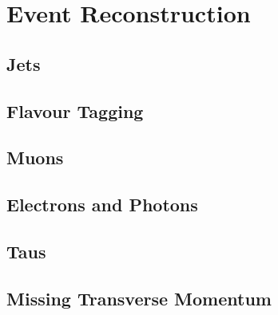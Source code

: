 \chapter{Event Reconstruction}\label{chapter:event_reconstruction}

\section{Jets}

\section{Flavour Tagging}

\section{Muons}

\section{Electrons and Photons}

\section{Taus}

\section{Missing Transverse Momentum}
